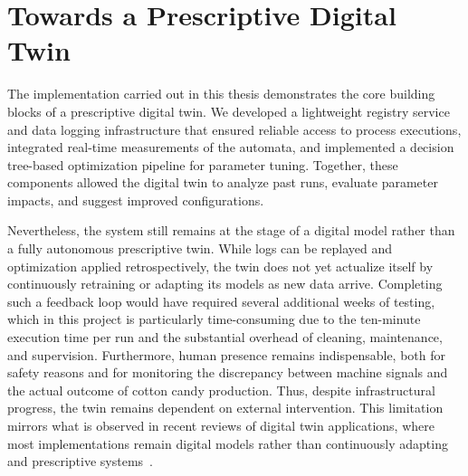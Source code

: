 \section{Towards a Prescriptive Digital Twin}
The implementation carried out in this thesis demonstrates the core building blocks of a prescriptive digital twin.  We developed a lightweight registry service and data logging infrastructure that ensured reliable access to process executions, integrated real-time measurements of the automata, and implemented a decision tree-based optimization pipeline for parameter tuning. Together, these components allowed the digital twin to analyze past runs, evaluate parameter impacts, and suggest improved configurations. 

Nevertheless, the system still remains at the stage of a digital model rather than a fully autonomous prescriptive twin. While logs can be replayed and optimization applied retrospectively, the twin does not yet actualize itself by continuously retraining or adapting its models as new data arrive. Completing such a feedback loop would have required several additional weeks of testing, which in this project is particularly time-consuming due to the ten-minute execution time per run and the substantial overhead of cleaning, maintenance, and supervision. Furthermore, human presence remains indispensable, both for safety reasons and for monitoring the discrepancy between machine signals and the actual outcome of cotton candy production. Thus, despite infrastructural progress, the twin remains dependent on external intervention. This limitation mirrors what is observed in recent reviews of digital twin applications, where most implementations remain digital models rather than continuously adapting and prescriptive systems~\cite{KREUZER2024102304}.